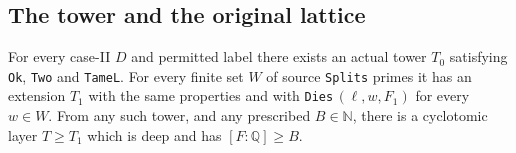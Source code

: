 \subsection{The tower and the original lattice}

\begin{proposition}
For every case-II $D$ and permitted label there exists an
actual tower $T_0$ satisfying \texttt{Ok}, \texttt{Two} and
\texttt{TameL}.  For every finite set $W$ of source
\texttt{Splits} primes it has an extension $T_1$ with the
same properties and with \texttt{Dies}$\,(\ell,w,F_1)$ for
every $w\in W$.  From any such tower, and any prescribed
$B\in\mathbb N$, there is a cyclotomic layer $T\ge T_1$
which is deep and has $[F:\mathbb Q]\ge B$.
\end{proposition}

